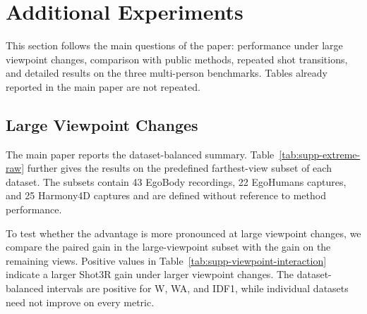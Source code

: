 \clearpage
\section{Additional Experiments}
\label{app:full-results}
\suppressfloats[t]

This section follows the main questions of the paper: performance under large
viewpoint changes, comparison with public methods, repeated shot transitions,
and detailed results on the three multi-person benchmarks. Tables already
reported in the main paper are not repeated.

\subsection{Large Viewpoint Changes}
\label{app:cross-dataset-viewpoint}

The main paper reports the dataset-balanced summary. Table~\ref{tab:supp-extreme-raw}
further gives the results on the predefined farthest-view subset of each
dataset. The subsets contain 43 EgoBody recordings, 22 EgoHumans captures,
and 25 Harmony4D captures and are defined without reference to method
performance.

\begin{table}[t]
  \centering
  \caption{Results on the predefined large-viewpoint subsets. W/WA are in
  mm and camera ATE is in m (Sim(3) for EgoBody/Harmony4D and SE(3) for
  EgoHumans).}
  \label{tab:supp-extreme-raw}
  \small
  \resizebox{\textwidth}{!}{}
\end{table}

To test whether the advantage is more pronounced at large viewpoint changes, we compare the
paired gain in the large-viewpoint subset with the gain on the remaining
views. Positive values in Table~\ref{tab:supp-viewpoint-interaction} indicate
a larger Shot3R gain under larger viewpoint changes. The dataset-balanced intervals are
positive for W, WA, and IDF1, while individual datasets need not improve on
every metric.


